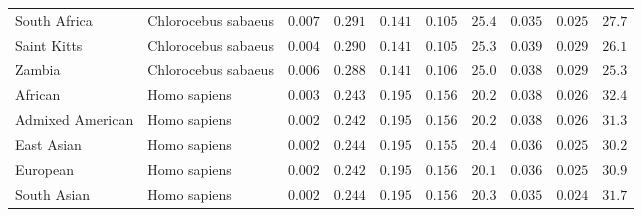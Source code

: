 \documentclass{article}
\begin{document}
\begin{center}
\begin{longtable*}{|l|l|r|r|r|r|r|r|r|r|}
            South Africa         & Chlorocebus sabaeus & $ 0.007$              & $ 0.291$                      & $ 0.141$ & $ 0.105$     & $  25.4$      & $ 0.035$ & $ 0.025$ & $  27.7$ \\
            Saint Kitts          & Chlorocebus sabaeus & $ 0.004$              & $ 0.290$                      & $ 0.141$ & $ 0.105$     & $  25.3$      & $ 0.039$ & $ 0.029$ & $  26.1$ \\
            Zambia               & Chlorocebus sabaeus & $ 0.006$              & $ 0.288$                      & $ 0.141$ & $ 0.106$     & $  25.0$      & $ 0.038$ & $ 0.029$ & $  25.3$ \\
            African              & Homo sapiens        & $ 0.003$              & $ 0.243$                      & $ 0.195$ & $ 0.156$     & $  20.2$      & $ 0.038$ & $ 0.026$ & $  32.4$ \\
            Admixed American     & Homo sapiens        & $ 0.002$              & $ 0.242$                      & $ 0.195$ & $ 0.156$     & $  20.2$      & $ 0.038$ & $ 0.026$ & $  31.3$ \\
            East Asian           & Homo sapiens        & $ 0.002$              & $ 0.244$                      & $ 0.195$ & $ 0.155$     & $  20.4$      & $ 0.036$ & $ 0.025$ & $  30.2$ \\
            European             & Homo sapiens        & $ 0.002$              & $ 0.242$                      & $ 0.195$ & $ 0.156$     & $  20.1$      & $ 0.036$ & $ 0.025$ & $  30.9$ \\
            South Asian          & Homo sapiens        & $ 0.002$              & $ 0.244$                      & $ 0.195$ & $ 0.156$     & $  20.3$      & $ 0.035$ & $ 0.024$ & $  31.7$ \\
        \end{longtable*}
    \end{center}
\end{document}
